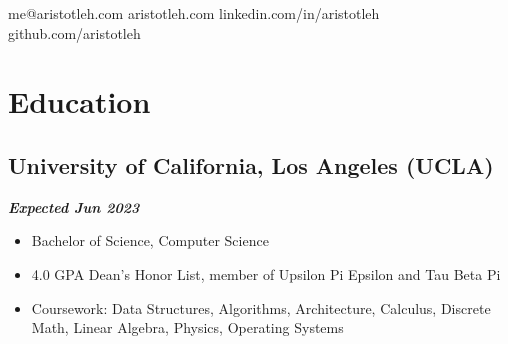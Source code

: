\documentclass[10pt]{article}
\begin{document}

    \begin{raggedright}

    \thispagestyle{empty}


    \titlespacing*{\section}{0pt}{8pt}{4pt}
    \titlespacing*{\subsection}{0pt}{4pt}{0pt}

    \begin{center}
        \openup 6pt

        {\fontsize{28pt}{14pt}}

        me@aristotleh.com {\textbar} aristotleh.com {\textbar} linkedin.com/in/aristotleh {\textbar} github.com/aristotleh
    \end{center}

    \section*{Education}

        \subsection*{\textbf{\large{University of California, Los Angeles (UCLA)}}} \hfill \textbf{\textit{Expected Jun 2023}}
        \begin{itemize}
            \item Bachelor of Science, Computer Science
            \item 4.0 GPA \textendash{} Dean's Honor List, member of Upsilon Pi Epsilon and Tau Beta Pi
            \item Coursework: Data Structures, Algorithms, Architecture, Calculus, Discrete Math, Linear Algebra, Physics, Operating Systems
        \end{itemize}


\end{raggedright}
\end{document}
